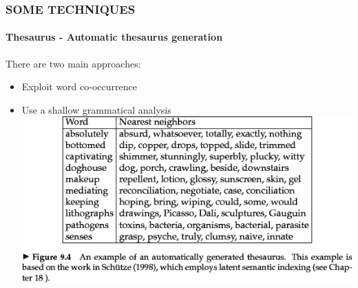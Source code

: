 \documentclass[10pt]{beamer}
\begin{document}
\begin{frame}
    \frametitle{\textbf{SOME TECHNIQUES}}
    \framesubtitle{\textbf{Thesaurus} - Automatic thesaurus generation}
    There are two main approaches:\pause
    \begin{itemize}
        \item Exploit word co-occurrence \pause
        \item Use a shallow grammatical analysis\pause
        \\ \vspace{15pt}
        \includegraphics[scale = 0.45]{auto_thesaurus_generation.png}
    \end{itemize}
\end{frame}
\end{document}
